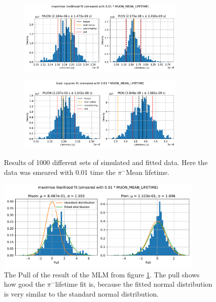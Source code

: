 \documentclass[11pt, a4paper, oneside]{book}
\newcommand\DoublePlotwidth{0.9}
\newcommand{\pion}{$\pi^{-}$}
\begin{document}
\begin{figure}[h]
\begin{subfigure}{\textwidth}
  \centering
  \includegraphics[width=\DoublePlotwidth\textwidth]{images/4b_hist_0_likelihood.pdf}
\end{subfigure}

\begin{subfigure}{\textwidth}
  \centering
  \includegraphics[width=\DoublePlotwidth\textwidth]{images/4b_hist_0_squares.pdf}
\end{subfigure}
\caption{Results of 1000 different sets of simulated and fitted data. Here the data was smeared with 0.01 time the \pion Mean lifetime.}
\label{fig:results_smeared_0}
\end{figure}

\begin{figure}[h]
    \centering
    \includegraphics[width=\DoublePlotwidth\textwidth]{images/4b_pull_0_likelihood.pdf}
    \caption{The Pull of the result of the MLM from figure \ref{fig:results_smeared_0}. The pull shows how good the \pion lifetime fit is, because the fitted normal distribution is very similar to the standard normal distribution.}
    \label{fig:smeared_pull_0}
\end{figure}
\end{document}
